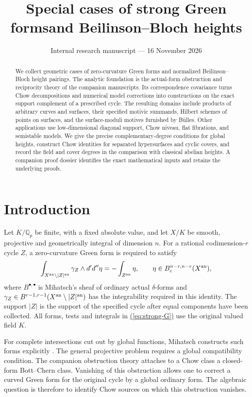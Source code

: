 \documentclass[11pt,a4paper]{article}
\title{Special cases of strong Green forms\newline and Beilinson--Bloch heights}
\author{}
\date{Internal research manuscript --- 16 November 2026}
\theoremstyle{definition}
\theoremstyle{remark}\newtheorem{remark}[theorem]{Remark}
\numberwithin{equation}{section}
\newcommand{\Q}{\mathbb Q}\newcommand{\R}{\mathbb R}\newcommand{\C}{\mathbb C}
\newcommand{\D}{d'd''}\newcommand{\ob}{\mathfrak o}
\renewcommand{\eqref}[1]{\hyperref[#1]{\textcolor{equationlink}{(\ref*{#1})}}}
\begin{document}
\maketitle
\begin{abstract}
We collect geometric cases of zero-curvature Green forms and normalized
Beilinson--Bloch height pairings. The analytic foundation is the actual-form
obstruction and reciprocity theory of the companion manuscripts. Its
correspondence covariance turns Chow decompositions and numerical model
corrections into constructions on the exact support complement of a prescribed
cycle. The resulting domains include products of arbitrary curves and
surfaces, their specified motivic summands, Hilbert schemes of points on
surfaces, and the surface-moduli motives furnished by B\"ulles. Other
applications use low-dimensional diagonal support, Chow niveau, flat
fibrations, and semistable models. We give the precise complementary-degree
conditions for global heights, construct Chow identities for separated
hypersurfaces and cyclic covers, and record the field and cover degrees in
the comparison with classical abelian heights. A companion proof dossier
identifies the exact mathematical inputs and retains the underlying proofs.
\end{abstract}
\tableofcontents

\section{Introduction}\label{sec:intro}

Let $K/\Q_p$ be finite, with a fixed absolute value, and let $X/K$ be smooth,
projective and geometrically integral of dimension $n$. For a rational
codimension-$r$ cycle $Z$, a zero-curvature Green form is required to satisfy
\begin{equation}\label{eq:strong-G}
 \int_{X^{\an}\setminus |Z|^{\an}}\gamma_Z\wedge\D\eta
       =-\int_{Z^{\an}}\eta,
 \qquad \eta\in B_c^{n-r,n-r}(X^{\an}),
\end{equation}
where $B^{\bullet,\bullet}$ is Mihatsch's sheaf of ordinary actual
$\delta$-forms and
$\gamma_Z\in B^{r-1,r-1}(X^{\mathrm{an}}\setminus |Z|^{\mathrm{an}})$ has the
integrability required in this identity. The support $|Z|$ is the support of
the specified cycle after equal components have been collected. All forms,
tests and integrals in \eqref{eq:strong-G} use the original valued field $K$.

For complete intersections cut out by global functions, Mihatsch constructs
such forms explicitly \cite[Theorem 5.5]{Mihatsch}. The general projective
problem requires a global compatibility condition. The companion obstruction
theory \cite{InternalGreen,InternalNumerical,InternalCovariance} attaches to a
Chow class a closed-form Bott--Chern class. Vanishing of this obstruction
allows one to correct a curved Green form for the original cycle by a global
ordinary form. The algebraic question is therefore to identify Chow sources
on which this obstruction vanishes.
\end{document}
